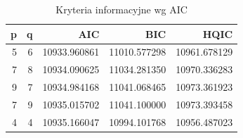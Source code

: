 \documentclass{article}
\theoremstyle{break}
\begin{document}
\begin{table}[H]
	\centering
	\begin{tabular}{|r|r|r|r|r|}
		\hline
		\rowcolor[HTML]{C0C0C0} 
		{\color[HTML]{343434} \textbf{p}} & {\color[HTML]{343434} \textbf{q}} & {\color[HTML]{343434} \textbf{AIC}} & {\color[HTML]{343434} \textbf{BIC}} & {\color[HTML]{343434} \textbf{HQIC}} \\ \hline
		{\color[HTML]{343434} 5}          & {\color[HTML]{343434} 6}          & {\color[HTML]{343434} 10933.960861} & {\color[HTML]{343434} 11010.577298} & {\color[HTML]{343434} 10961.678129}  \\ \hline
		{\color[HTML]{343434} 7}          & {\color[HTML]{343434} 8}          & {\color[HTML]{343434} 10934.090625} & {\color[HTML]{343434} 11034.281350} & {\color[HTML]{343434} 10970.336283}  \\ \hline
		{\color[HTML]{343434} 9}          & {\color[HTML]{343434} 7}          & {\color[HTML]{343434} 10934.984168} & {\color[HTML]{343434} 11041.068465} & {\color[HTML]{343434} 10973.361923}  \\ \hline
		{\color[HTML]{343434} 7}          & {\color[HTML]{343434} 9}          & {\color[HTML]{343434} 10935.015702} & {\color[HTML]{343434} 11041.100000} & {\color[HTML]{343434} 10973.393458}  \\ \hline
		{\color[HTML]{343434} 4}          & {\color[HTML]{343434} 4}          & {\color[HTML]{343434} 10935.166047} & {\color[HTML]{343434} 10994.101768} & {\color[HTML]{343434} 10956.487023}  \\ \hline
	\end{tabular}
\caption{Kryteria informacyjne wg AIC}
\label{t1}
\end{table}
\end{document}
